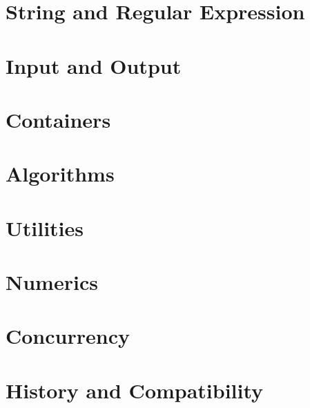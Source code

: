 \documentclass{article}
\begin{document}
\section{String and Regular Expression}

\section{Input and Output}

\section{Containers}

\section{Algorithms}

\section{Utilities}

\section{Numerics}

\section{Concurrency}

\section{History and Compatibility}
\end{document}
